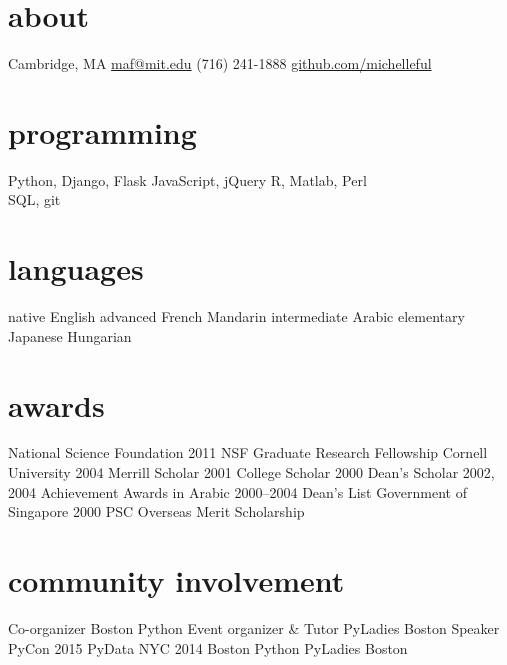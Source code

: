 \documentclass[]{friggeri-cv}
\begin{document}


\begin{aside}
  \section{about}
	Cambridge, MA
    \href{mailto:maf@mit.edu}{maf@mit.edu}
    (716) 241-1888
    \href{http://github.com/michelleful}{github.com/michelleful}
  \section{programming}
    Python, Django, Flask
    JavaScript, jQuery
	R, Matlab, Perl \\ %
	SQL, git
  \section{languages}
	{\footnotesize{}native} English
	{\footnotesize{}advanced} French
	         Mandarin
	{\footnotesize{}intermediate} Arabic
	{\footnotesize{}elementary} Japanese
	           Hungarian
  \section{awards}
    {\footnotesize{}National Science Foundation}
    {\footnotesize{}2011} NSF Graduate Research Fellowship
    {\footnotesize{}Cornell University} 
    {\footnotesize{}2004} Merrill Scholar
    {\footnotesize{}2001} College Scholar
    {\footnotesize{}2000} Dean's Scholar
    {\footnotesize{}2002, 2004} Achievement Awards in Arabic
    {\footnotesize{}2000--2004} Dean's List
    {\footnotesize{}Government of Singapore}
    {\footnotesize{}2000} PSC Overseas Merit Scholarship 
  \section{community involvement}
    {\footnotesize{}Co-organizer}
    Boston Python
    {\footnotesize{}Event organizer \& Tutor}
    PyLadies Boston
    {\footnotesize{}Speaker}
	PyCon 2015
	PyData NYC 2014
    Boston Python
    PyLadies Boston
\end{aside}
\end{document}

